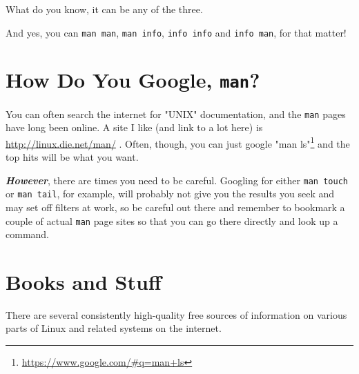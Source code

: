 \documentclass[10pt,american,]{book}
\renewcommand{\href}[2]{#2\footnote{\url{#1}}}
\numberwithin{figure}{chapter}
\begin{document}
What do you know, it can be any of the three.

And yes, you can \texttt{man\ man}, \texttt{man\ info},
\texttt{info\ info} and \texttt{info\ man}, for that matter!

\section*{\texorpdfstring{How Do You Google,
\texttt{man}?}{How Do You Google, man?}}\label{how-do-you-google-man}

You can often search the internet for "UNIX" documentation, and the
\texttt{man} pages have long been online. A site I like (and link to a
lot here) is \url{http://linux.die.net/man/}
.
Often, though, you can just google
\href{https://www.google.com/\#q=man+ls}{"man ls"} and the top hits will
be what you want.

\textbf{\emph{However}}, there are times you need to be careful.
Googling for either \texttt{man\ touch} or \texttt{man\ tail}, for
example, will probably not give you the results you seek and may set off
filters at work, so be careful out there and remember to bookmark a
couple of actual \texttt{man} page sites so that you can go there
directly and look up a command.

\section*{Books and Stuff}\label{books-and-stuff}

There are several consistently high-quality free sources of information
on various parts of Linux and related systems on the internet.
\end{document}

